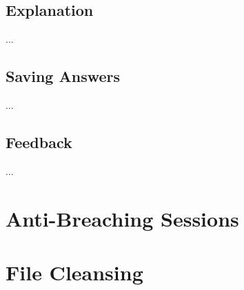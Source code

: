 \subsection{Explanation}
...
\subsection{Saving Answers}
...
\subsection{Feedback}
...
\section{Anti-Breaching Sessions}
\section{File Cleansing}